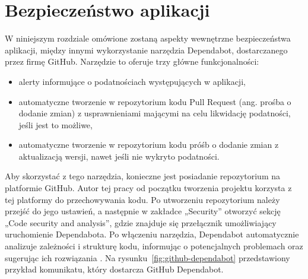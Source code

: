 \documentclass[12pt,oneside]{book}
\begin{document}
    \section{Bezpieczeństwo aplikacji}
    W niniejszym rozdziale omówione zostaną aspekty wewnętrzne bezpieczeństwa aplikacji, między innymi wykorzystanie narzędzia Dependabot, dostarczanego przez firmę GitHub. Narzędzie to oferuje trzy główne funkcjonalności:

    \begin{itemize}
        \item alerty informujące o podatnościach występujących w aplikacji,
        \item automatyczne tworzenie w repozytorium kodu Pull Request (ang. prośba o dodanie zmian) z usprawnieniami mającymi na celu likwidację podatności, jeśli jest to możliwe,
        \item automatyczne tworzenie w repozytorium kodu próśb o dodanie zmian z aktualizacją wersji, nawet jeśli nie wykryto podatności.
    \end{itemize}

    Aby skorzystać z tego narzędzia, konieczne jest posiadanie repozytorium na platformie GitHub. Autor tej pracy od początku tworzenia projektu korzysta z tej platformy do przechowywania kodu. Po utworzeniu repozytorium należy przejść do jego ustawień, a następnie w zakładce „Security” otworzyć sekcję „Code security and analysis”, gdzie znajduje się przełącznik umożliwiający uruchomienie Dependabota. Po włączeniu narzędzia, Dependabot automatycznie analizuje zależności i strukturę kodu, informując o potencjalnych problemach oraz sugerując ich rozwiązania \cite{github.dependabot}. Na rysunku~\ref{fig:github-dependabot} przedstawiony przykład komunikatu, który dostarcza GitHub Dependabot.
\end{document}
